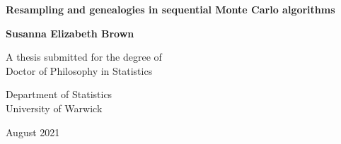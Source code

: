 \documentclass[oneside]{scrbook} %
\theoremstyle{definition}
\newcommand{\1}[1]{\mathbbm{1}_{#1}} %
\begin{document}
\begin{titlepage}
\centering
\vspace*{5cm}
\begin{LARGE}\bfseries
Resampling and genealogies in sequential Monte Carlo algorithms\par \end{LARGE} 
\vspace{1.5cm} 
\begin{Large}\bfseries
Susanna Elizabeth Brown\par
\end{Large}
\vspace{3cm}
\begin{large}
A thesis submitted for the degree of\\Doctor of Philosophy in Statistics \par
\vspace{1.5cm}
Department of Statistics\\ University of Warwick \par
\vspace{1.5cm}
August 2021 %
\end{large}
\end{titlepage}


\frontmatter


\tableofcontents
\listoffigures
\listoftables

\end{document}
